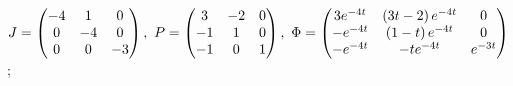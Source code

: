 \begin{enumsolsfull}
		\item \( J = \begin{pmatrix} -4 & 1 & 0 \\ 0 & -4 & 0 \\ 0 & 0 & -3 \end{pmatrix}, ~ P = \begin{pmatrix} 3 & -2 & 0 \\ -1 & 1 & 0 \\ -1 & 0 & 1 \end{pmatrix}, ~ \Phi = \begin{pmatrix} 3e^{-4t} & \left( 3t - 2 \right) e^{-4t} & 0 \\ -e^{-4t} & \left( 1 - t \right) e^{-4t} & 0 \\ -e^{-4t} & -te^{-4t} & e^{-3t} \end{pmatrix} \); %

\end{enumsolsfull}
